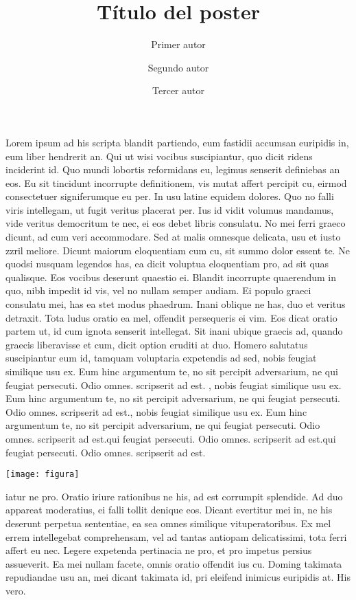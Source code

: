 \documentclass[11pt,a4paper]{article}
\title{\vspace{-5ex}Título del poster}	%
\author[1,2]{Primer autor}
\author[1]{Segundo autor}
\author[2]{Tercer autor}
\affil[1]{Afiliación uno}
\affil[2]{Afiliación dos\vspace{1ex}}	%
\affil[ ]{\texttt{email@decontacto}\vspace{-4ex}}	%
\date{}
\begin{document}
  \maketitle
  \thispagestyle{empty}

\begin{multicols}{2}

Lorem ipsum ad his scripta blandit partiendo, eum fastidii accumsan euripidis in, eum liber hendrerit an. Qui ut wisi vocibus suscipiantur, quo dicit ridens inciderint id. Quo mundi lobortis reformidans eu, legimus senserit definiebas an eos. Eu sit tincidunt incorrupte definitionem, vis mutat affert percipit cu, eirmod consectetuer signiferumque eu per. In usu latine equidem dolores. Quo no falli viris intellegam, ut fugit veritus placerat per. Ius id vidit volumus mandamus, vide veritus democritum te nec, ei eos debet libris consulatu. No mei ferri graeco dicunt, ad cum veri accommodare. Sed at malis omnesque delicata, usu et iusto zzril meliore. Dicunt maiorum eloquentiam cum cu, sit summo dolor essent te. Ne quodsi nusquam legendos has, ea dicit voluptua eloquentiam pro, ad sit quas qualisque. Eos vocibus deserunt quaestio ei. Blandit incorrupte quaerendum in quo, nibh impedit id vis, vel no nullam semper audiam. Ei populo graeci consulatu mei, has ea stet modus phaedrum. Inani oblique ne has, duo et 
veritus detraxit. Tota ludus oratio ea mel, offendit persequeris ei vim. Eos dicat oratio partem ut, id cum ignota senserit intellegat. Sit inani ubique graecis ad, quando graecis liberavisse et cum, dicit option eruditi at duo. Homero salutatus suscipiantur eum id, tamquam voluptaria expetendis ad sed, nobis feugiat similique usu ex. Eum hinc argumentum te, no sit percipit adversarium, ne qui feugiat persecuti. Odio omnes. scripserit ad est. , nobis feugiat similique usu ex. Eum hinc argumentum te, no sit percipit adversarium, ne qui feugiat persecuti. Odio omnes. scripserit ad est., nobis feugiat similique usu ex. Eum hinc argumentum te, no sit percipit adversarium, ne qui feugiat persecuti. Odio omnes. scripserit ad est.qui feugiat persecuti. Odio omnes. scripserit ad est.qui feugiat persecuti. Odio omnes. scripserit ad est.

\begin{center}
 \texttt{[image: figura]}
\end{center}

iatur ne pro. Oratio iriure rationibus ne his, ad est corrumpit splendide. Ad duo appareat moderatius, ei falli tollit denique eos. Dicant evertitur mei in, ne his deserunt perpetua sententiae, ea sea omnes similique vituperatoribus. Ex mel errem intellegebat comprehensam, vel ad tantas antiopam delicatissimi, tota ferri affert eu nec. Legere expetenda pertinacia ne pro, et pro impetus persius assueverit. Ea mei nullam facete, omnis oratio offendit ius cu. Doming takimata repudiandae usu an, mei dicant takimata id, pri 
eleifend inimicus euripidis at. His vero. 
\end{multicols}
\end{document}
